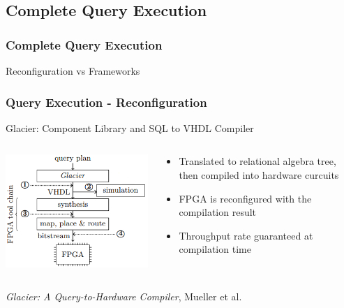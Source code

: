 \documentclass{beamer}
\begin{document}
\subsection{Complete Query Execution}
\begin{frame}
	\frametitle{Complete Query Execution}
	\begin{center}
		\huge{Reconfiguration vs Frameworks}
	\end{center}
	
\end{frame}

\begin{frame}
	\frametitle{Query Execution - Reconfiguration}
	Glacier: Component Library and SQL to VHDL Compiler 
	\vspace*{0.2cm}
	\begin{columns}
		\begin{column}{0.48\textwidth}
			\includegraphics[width=1.0\textwidth]{img/glacier_2.png}
		\end{column}
		\begin{column}{0.48\textwidth}
			\begin{itemize}
				\item Translated to relational algebra tree, then compiled into hardware curcuits
				\item FPGA is reconfigured with the compilation result 
				\item Throughput rate guaranteed at compilation time
			\end{itemize}
		\end{column}
	\end{columns}
\vspace*{0.2cm}
	\begin{center}
		\small \emph{Glacier: A Query-to-Hardware Compiler}, Mueller et al.
	\end{center}
\end{frame}
\end{document}
